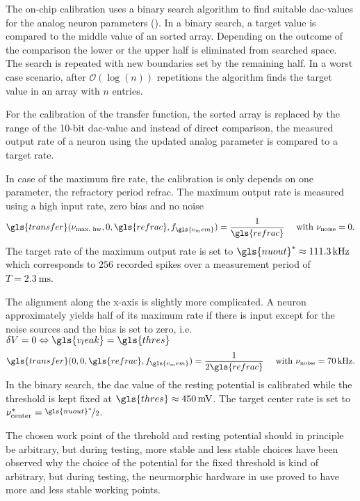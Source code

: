 The on-chip calibration uses a binary search algorithm to find suitable \gls{dac}-values for the analog neuron parameters (\citealp{binarysearchsource}). In a binary search, a target value is compared to the middle value of an sorted array. Depending on the outcome of the comparison the lower or the upper half is eliminated from searched space. The search is repeated with new boundaries set by the remaining half. In a worst case scenario, after $\mathcal{O}(\log(n))$ repetitions the algorithm finds the target value in an array with $n$ entries.

For the calibration of the transfer function, the sorted array is replaced by the range of the 10-bit \gls{dac}-value and instead of direct comparison, the measured output rate of a neuron using the updated analog parameter is compared to a target rate.

In case of the maximum fire rate, the calibration is only depends on one parameter, the refractory period \gls{refrac}. The maximum output rate is measured using a high input rate, zero bias and no noise
\begin{equation}
\gls{transfer}(\nu_\text{max, hw}, 0, \gls{refrac}, f_{\gls{v_mem}}) = \frac{1}{\gls{refrac}} \quad \text{ with } \nu_\text{noise} = 0.
\end{equation}
The target rate of the maximum output rate is set to $\gls{nuout}^* \approx \SI{111.3}{\kilo \Hz}$ which corresponds to $256$ recorded spikes over a measurement period of $T=\SI{2.3}{\milli \s}$.

The alignment along the x-axis is slightly more complicated. A neuron approximately yields half of its maximum rate if there is input except for the noise sources and the bias is set to zero, i.e. $\delta V = 0 \Leftrightarrow \gls{v_leak} = \gls{thres}$
\begin{equation}
	\gls{transfer}(0, 0, \gls{refrac}, f_{\gls{v_mem}}) = \frac{1}{2\gls{refrac}} \quad \text{ with } \nu_\text{noise} = \SI{70}{kHz}.
\end{equation}
In the binary search, the \gls{dac} value of the resting potential is calibrated while the threshold is kept fixed at $\gls{thres} \approx \SI{450}{\milli \V}$. The target center rate is set to $\nu_\text{center}^* = \nicefrac{\gls{nuout}^*}{2}$.

The chosen work point of the threhold and resting potential should in principle be arbitrary, but during testing, more stable and less stable choices have been observed why the choice of the potential for the fixed threshold is kind of arbitrary, but during testing, the neurmorphic hardware in use proved to have more and less stable working points. 

